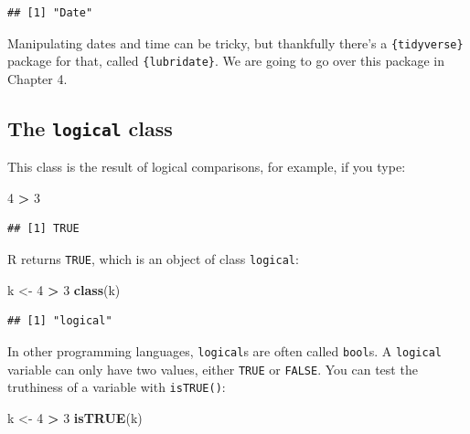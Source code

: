 \documentclass[]{gitbook}
\newenvironment{Shaded}{\begin{snugshade}}{\end{snugshade}}
\newcommand{\DecValTok}[1]{\textcolor[rgb]{0.00,0.00,0.81}{#1}}
\newcommand{\KeywordTok}[1]{\textcolor[rgb]{0.13,0.29,0.53}{\textbf{#1}}}
\newcommand{\NormalTok}[1]{#1}
\newcommand{\OperatorTok}[1]{\textcolor[rgb]{0.81,0.36,0.00}{\textbf{#1}}}
\newcommand{\StringTok}[1]{\textcolor[rgb]{0.31,0.60,0.02}{#1}}
\begin{document}
\begin{verbatim}
## [1] "Date"
\end{verbatim}

Manipulating dates and time can be tricky, but thankfully there's a \texttt{\{tidyverse\}} package for that,
called \texttt{\{lubridate\}}. We are going to go over this package in Chapter 4.

\hypertarget{the-logical-class}{%
\subsection{\texorpdfstring{The \texttt{logical} class}{The logical class}}\label{the-logical-class}}

This class is the result of logical comparisons, for example, if you type:

\begin{Shaded}
\begin{Highlighting}[]
\DecValTok{4} \OperatorTok{>}\StringTok{ }\DecValTok{3}
\end{Highlighting}
\end{Shaded}

\begin{verbatim}
## [1] TRUE
\end{verbatim}

R returns \texttt{TRUE}, which is an object of class \texttt{logical}:

\begin{Shaded}
\begin{Highlighting}[]
\NormalTok{k <-}\StringTok{ }\DecValTok{4} \OperatorTok{>}\StringTok{ }\DecValTok{3}
\KeywordTok{class}\NormalTok{(k)}
\end{Highlighting}
\end{Shaded}

\begin{verbatim}
## [1] "logical"
\end{verbatim}

In other programming languages, \texttt{logical}s are often called \texttt{bool}s. A \texttt{logical} variable can only have
two values, either \texttt{TRUE} or \texttt{FALSE}. You can test the truthiness of a variable with \texttt{isTRUE()}:

\begin{Shaded}
\begin{Highlighting}[]
\NormalTok{k <-}\StringTok{ }\DecValTok{4} \OperatorTok{>}\StringTok{ }\DecValTok{3}
\KeywordTok{isTRUE}\NormalTok{(k)}
\end{Highlighting}
\end{Shaded}
\end{document}
